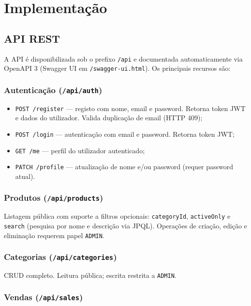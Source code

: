 \section{Implementação}
\label{sec:impl}

\subsection{API REST}

A API é disponibilizada sob o prefixo \texttt{/api} e documentada automaticamente via OpenAPI 3 (Swagger UI em \texttt{/swagger-ui.html}). Os principais recursos são:

\subsubsection{Autenticação (\texttt{/api/auth})}

\begin{itemize}
    \item \texttt{POST /register} — registo com nome, email e password. Retorna token JWT e dados do utilizador. Valida duplicação de email (HTTP 409);
    \item \texttt{POST /login} — autenticação com email e password. Retorna token JWT;
    \item \texttt{GET /me} — perfil do utilizador autenticado;
    \item \texttt{PATCH /profile} — atualização de nome e/ou password (requer password atual).
\end{itemize}

\subsubsection{Produtos (\texttt{/api/products})}

Listagem pública com suporte a filtros opcionais: \texttt{categoryId}, \texttt{activeOnly} e \texttt{search} (pesquisa por nome e descrição via JPQL). Operações de criação, edição e eliminação requerem papel \texttt{ADMIN}.

\subsubsection{Categorias (\texttt{/api/categories})}

CRUD completo. Leitura pública; escrita restrita a \texttt{ADMIN}.

\subsubsection{Vendas (\texttt{/api/sales})}

